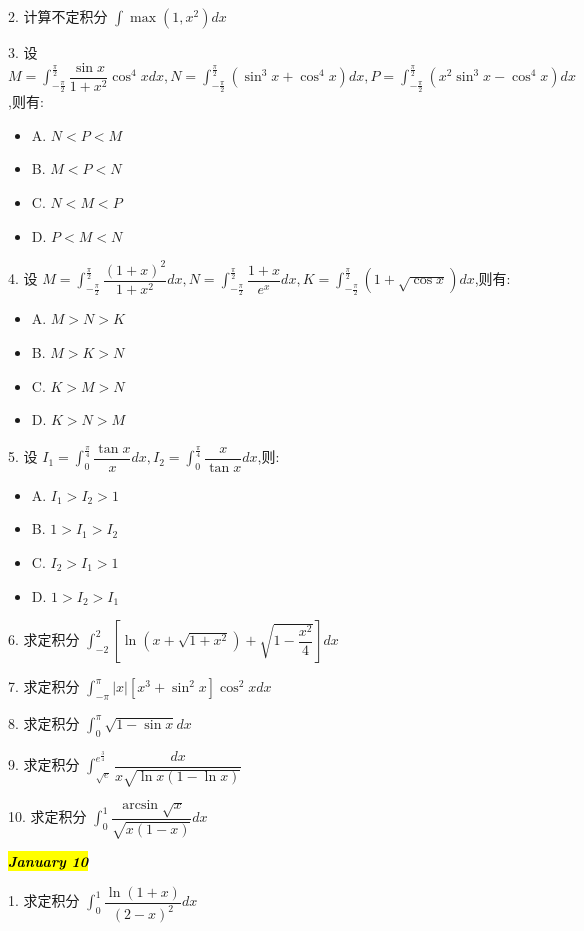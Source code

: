 2. 计算不定积分 $\int \max(1,x^{2})dx$

3. 设 $M=\int_{-\frac{\pi}{2}}^{\frac{\pi}{2}}\dfrac{\sin x}{1+x^{2}}\cos^{4}xdx,N=\int_{-\frac{\pi}{2}}^{\frac{\pi}{2}}(\sin^{3}x+\cos^{4}x)dx,P=\int_{-\frac{\pi}{2}}^{\frac{\pi}{2}}(x^{2}\sin^{3}x-\cos^{4}x)dx$,则有: 
\begin{itemize}
	\item A. $N<P<M$
	\item B. $M<P<N$
	\item C. $N<M<P$
	\item D. $P<M<N$
\end{itemize}

4. 设 $M=\int_{-\frac{\pi}{2}}^{\frac{\pi}{2}}\dfrac{(1+x)^{2}}{1+x^{2}}dx,N=\int_{-\frac{\pi}{2}}^{\frac{\pi}{2}}\dfrac{1+x}{e^{x}}dx,K=\int_{-\frac{\pi}{2}}^{\frac{\pi}{2}}(1+\sqrt{\cos x})dx$,则有: 
\begin{itemize}
	\item A. $M>N>K$
	\item B. $M>K>N$
	\item C. $K>M>N$
	\item D. $K>N>M$
\end{itemize}

5. 设 $I_{1}=\int_{0}^{\frac{\pi}{4}}\dfrac{\tan x}{x}dx,I_{2}=\int_{0}^{\frac{\pi}{4}}\dfrac{x}{\tan x}dx$,则:
\begin{itemize}
	\item A. $I_{1}>I_{2}>1$
	\item B. $1>I_{1}>I_{2}$
	\item C. $I_{2}>I_{1}>1$
	\item D. $1>I_{2}>I_{1}$
\end{itemize}

6. 求定积分 $\int_{-2}^{2}[\ln(x+\sqrt{1+x^{2}})+\sqrt{1-\dfrac{x^{2}}{4}}]dx$

7. 求定积分 $\int_{-\pi}^{\pi}|x|[x^{3}+\sin^{2}x]\cos^{2}xdx$

8. 求定积分 $\int_{0}^{\pi}\sqrt{1-\sin x}dx$

9. 求定积分 $\int_{\sqrt{e}}^{e^{\frac{3}{4}}}\dfrac{dx}{x\sqrt{\ln x(1-\ln x)}}$

10. 求定积分 $\int_{0}^{1}\dfrac{\arcsin \sqrt{x}}{\sqrt{x(1-x)}}dx$

\hl{\textbf{\textit{January 10}}}

1. 求定积分 $\int_{0}^{1}\dfrac{\ln(1+x)}{(2-x)^{2}}dx$

